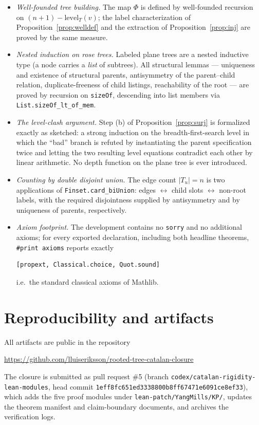 \documentclass[11pt]{article}
\theoremstyle{remark}
\theoremstyle{definition}
\begin{document}
\begin{itemize}
  \item \emph{Well-founded tree building.}  The map $\Phi$ is defined by
    well-founded recursion on $(n+1) - \mathrm{level}_T(v)$; the label
    characterization of Proposition~\ref{prop:welldef} and the extraction of
    Proposition~\ref{prop:inj} are proved by the same measure.
  \item \emph{Nested induction on rose trees.}  Labeled plane trees are a
    nested inductive type (a node carries a \emph{list} of subtrees).  All
    structural lemmas --- uniqueness and existence of structural parents,
    antisymmetry of the parent--child relation, duplicate-freeness of child
    listings, reachability of the root --- are proved by recursion on
    \texttt{sizeOf}, descending into list members via
    \texttt{List.sizeOf\_lt\_of\_mem}.
  \item \emph{The level-clash argument.}  Step (b) of
    Proposition~\ref{prop:surj} is formalized exactly as sketched: a strong
    induction on the breadth-first-search level in which the ``bad'' branch is
    refuted by instantiating the parent specification twice and letting the
    two resulting level equations contradict each other by linear arithmetic.
    No depth function on the plane tree is ever introduced.
  \item \emph{Counting by double disjoint union.}  The edge count
    $|T_u| = n$ is two applications of
    \texttt{Finset.card\_biUnion}: edges $\leftrightarrow$ child slots
    $\leftrightarrow$ non-root labels, with the required disjointness supplied
    by antisymmetry and by uniqueness of parents, respectively.
  \item \emph{Axiom footprint.}  The development contains no \texttt{sorry}
    and no additional axioms; for every exported declaration, including both
    headline theorems, \texttt{\#print axioms} reports exactly
\begin{verbatim}
[propext, Classical.choice, Quot.sound]
\end{verbatim}
    i.e.\ the standard classical axioms of Mathlib.
\end{itemize}

\section{Reproducibility and artifacts}\label{sec:repro}

All artifacts are public in the repository
\begin{center}
\url{https://github.com/lluiseriksson/rooted-tree-catalan-closure}
\end{center}
The closure is submitted as pull request \#5 (branch
\texttt{codex/catalan-rigidity-lean-modules}, head commit
\texttt{1eff8fc651ed3338800b8ff67471e6091ce8ef33}), which adds the five proof
modules under \texttt{lean-patch/YangMills/KP/}, updates the theorem manifest
and claim-boundary documents, and archives the verification logs.
\end{document}
